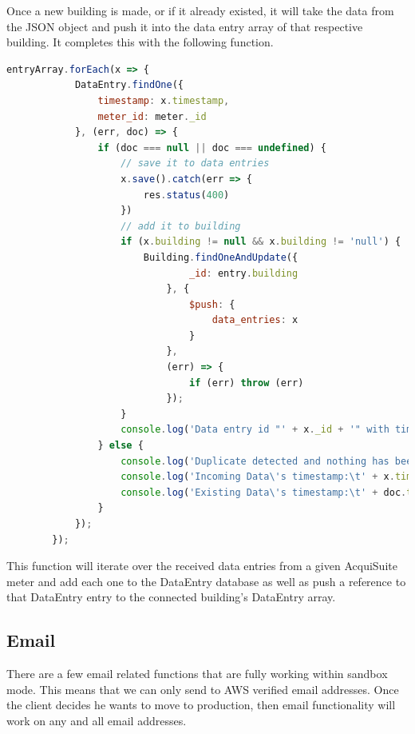 \documentclass[letterpaper,10pt,serif,draftclsnofoot,onecolumn,compsoc,titlepage]{IEEEtran}
\begin{document}
\noindent Once a new building is made, or if it already existed, it will take the data from the JSON object and push it into the data entry array of that respective building. It completes this with the following function.
\begin{lstlisting}[language=JavaScript]
 entryArray.forEach(x => {
            DataEntry.findOne({
                timestamp: x.timestamp,
                meter_id: meter._id
            }, (err, doc) => {
                if (doc === null || doc === undefined) {
                    // save it to data entries
                    x.save().catch(err => {
                        res.status(400)
                    })
                    // add it to building
                    if (x.building != null && x.building != 'null') {
                        Building.findOneAndUpdate({
                                _id: entry.building
                            }, {
                                $push: {
                                    data_entries: x
                                }
                            },
                            (err) => {
                                if (err) throw (err)
                            });
                    }
                    console.log('Data entry id "' + x._id + '" with timestamp ' + x.timestamp + ' added to the meter named "' + meter.name + '" which is assigned to building id: "' + meter.building + '"');
                } else {
                    console.log('Duplicate detected and nothing has been added!');
                    console.log('Incoming Data\'s timestamp:\t' + x.timestamp + '  meter_id:\t' + x.meter_id);
                    console.log('Existing Data\'s timestamp:\t' + doc.timestamp + '  meter_id:\t' + doc.meter_id);
                }
            });
        });
\end{lstlisting}
\noindent This function will iterate over the received data entries from a given AcquiSuite meter and add each one to the DataEntry database as well as push a reference to that DataEntry entry to the connected building's DataEntry array.

\subsection{Email}
There are a few email related functions that are fully working within sandbox mode. This means that we can only send to AWS verified email addresses. Once the client decides he wants to move to production, then email functionality will work on any and all email addresses.
\end{document}
